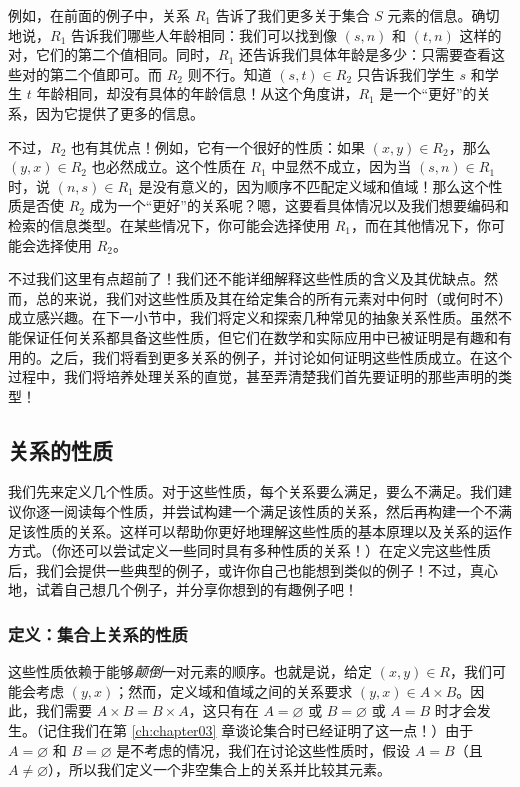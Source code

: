 例如，在前面的例子中，关系 $R_1$ 告诉了我们更多关于集合 $S$ 元素的信息。确切地说，$R_1$ 告诉我们哪些人年龄相同：我们可以找到像 $(s, n)$ 和 $(t, n)$ 这样的对，它们的第二个值相同。同时，$R_1$ 还告诉我们具体年龄是多少：只需要查看这些对的第二个值即可。而 $R_2$ 则不行。知道 $(s, t) \in R_2$ 只告诉我们学生 $s$ 和学生 $t$ 年龄相同，却没有具体的年龄信息！从这个角度讲，$R_1$ 是一个``更好''的关系，因为它提供了更多的信息。

不过，$R_2$ 也有其优点！例如，它有一个很好的性质：如果 $(x, y) \in R_2$，那么 $(y, x) \in R_2$ 也必然成立。这个性质在 $R_1$ 中显然不成立，因为当 $(s, n) \in R_1$ 时，说 $(n, s) \in R_1$ 是没有意义的，因为顺序不匹配定义域和值域！那么这个性质是否使 $R_2$ 成为一个``更好''的关系呢？嗯，这要看具体情况以及我们想要编码和检索的信息类型。在某些情况下，你可能会选择使用 $R_1$，而在其他情况下，你可能会选择使用 $R_2$。

不过我们这里有点超前了！我们还不能详细解释这些性质的含义及其优缺点。然而，总的来说，我们对这些性质及其在给定集合的所有元素对中何时（或何时不）成立感兴趣。在下一小节中，我们将定义和探索几种常见的抽象关系性质。虽然不能保证任何关系都具备这些性质，但它们在数学和实际应用中已被证明是有趣和有用的。之后，我们将看到更多关系的例子，并讨论如何证明这些性质成立。在这个过程中，我们将培养处理关系的直觉，甚至弄清楚我们首先要证明的那些声明的类型！

\subsection{关系的性质}

我们先来定义几个性质。对于这些性质，每个关系要么满足，要么不满足。我们建议你逐一阅读每个性质，并尝试构建一个满足该性质的关系，然后再构建一个不满足该性质的关系。这样可以帮助你更好地理解这些性质的基本原理以及关系的运作方式。（你还可以尝试定义一些同时具有多种性质的关系！）在定义完这些性质后，我们会提供一些典型的例子，或许你自己也能想到类似的例子！不过，真心地，试着自己想几个例子，并分享你想到的有趣例子吧！

\subsubsection*{定义：集合上关系的性质}

这些性质依赖于能够\emph{颠倒}一对元素的顺序。也就是说，给定 $(x, y) \in R$，我们可能会考虑 $(y, x)$；然而，定义域和值域之间的关系要求 $(y, x) \in A \times B$。因此，我们需要 $A \times B = B \times A$，这只有在 $A = \varnothing$ 或 $B = \varnothing$ 或 $A = B$ 时才会发生。（记住我们在第 \ref{ch:chapter03} 章谈论集合时已经证明了这一点！）由于 $A = \varnothing$ 和 $B = \varnothing$ 是不考虑的情况，我们在讨论这些性质时，假设 $A = B$（且 $A \ne \varnothing$），所以我们定义一个非空集合上的关系并比较其元素。

